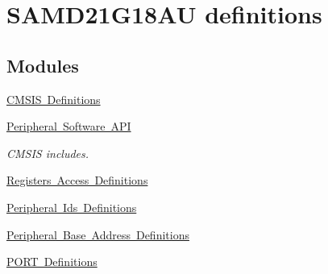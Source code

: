 \hypertarget{group___s_a_m_d21_g18_a_u__definitions}{}\section{S\+A\+M\+D21\+G18\+AU definitions}
\label{group___s_a_m_d21_g18_a_u__definitions}
\subsection*{Modules}
\begin{DoxyCompactItemize}
\item 
\mbox{\hyperlink{group___s_a_m_d21_g18_a_u__cmsis}{C\+M\+S\+I\+S Definitions}}
\item 
\mbox{\hyperlink{group___s_a_m_d21_g18_a_u__api}{Peripheral Software A\+PI}}
\begin{DoxyCompactList}\small\item\em C\+M\+S\+IS includes. \end{DoxyCompactList}\item 
\mbox{\hyperlink{group___s_a_m_d21_g18_a_u__reg}{Registers Access Definitions}}
\item 
\mbox{\hyperlink{group___s_a_m_d21_g18_a_u__id}{Peripheral Ids Definitions}}
\item 
\mbox{\hyperlink{group___s_a_m_d21_g18_a_u__base}{Peripheral Base Address Definitions}}
\item 
\mbox{\hyperlink{group___s_a_m_d21_g18_a_u__port}{P\+O\+R\+T Definitions}}
\end{DoxyCompactItemize}
